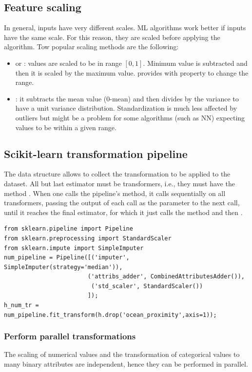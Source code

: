 \subsection{Feature scaling}
In general, inputs have very different scales. ML algorithms work better if inputs have the same scale. For this reason, they are scaled before applying the algorithm. Tow popular scaling methods are the following:
\begin{itemize}
\item {} or : values are scaled to be in range $[0,1]$. Minimum value is subtracted and then it is scaled by the maximum value.  provides  with  property to change the range.
\item {}: it subtracts the mean value (0-mean) and then divides by the variance to have a unit variance distribution. Standardization is much less affected by outliers but might be a problem for some algorithms (such as NN) expecting values to be within a given range.
\end{itemize}

\subsection{Scikit-learn transformation pipeline}
The  data structure allows to collect the transformation to be applied to the dataset. All but last estimator must be transformers, i.e., they must have the method . When one calls the pipeline's method, it calls  sequentially on all transformers, passing the output of each call as the parameter to the next call, until it reaches the final estimator, for which it just calls the  method and then .
\begin{lstlisting}
from sklearn.pipeline import Pipeline
from sklearn.preprocessing import StandardScaler
from sklearn.impute import SimpleImputer
num_pipeline = Pipeline([('imputer', SimpleImputer(strategy='median')),
                        ('attribs_adder', CombinedAttributesAdder()),
                         ('std_scaler', StandardScaler())
                        ]);
h_num_tr = num_pipeline.fit_transform(h.drop('ocean_proximity',axis=1));
\end{lstlisting}
\subsubsection{Perform parallel transformations}
The scaling of numerical values and the transformation of categorical values to many binary attributes are independent, hence they can be performed in parallel.

